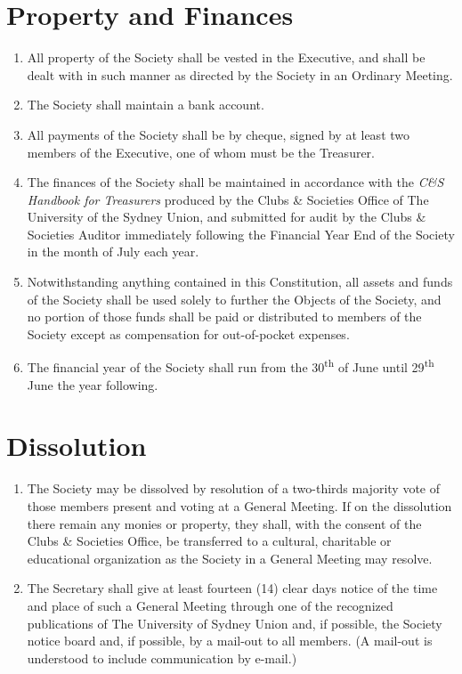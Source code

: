 \documentclass[11pt]{article}
\begin{document}
\section{Property and Finances}
\begin{enumerate}[\thesection .1]
    \item All property of the Society shall be vested in the Executive, and shall be dealt with in such manner as directed by the Society in an Ordinary Meeting.
    \item The Society shall maintain a bank account.
    \item All payments of the Society shall be by cheque, signed by at least two members of the Executive, one of whom must be the Treasurer.
    \item The finances of the Society shall be maintained in accordance with the \textit{C\&S Handbook for Treasurers} produced by the Clubs \& Societies Office of The University of the Sydney Union, and submitted for audit by the Clubs \& Societies Auditor immediately following the Financial Year End of the Society in the month of July each year.
    \item Notwithstanding anything contained in this Constitution, all assets and funds of the Society shall be used solely to further the Objects of the Society, and no portion of those funds shall be paid or distributed to members of the Society except as compensation for out-of-pocket expenses.
    \item The financial year of the Society shall run from the 30\textsuperscript{th} of June until 29\textsuperscript{th} June the year following.	
\end{enumerate}


\section{Dissolution}
\begin{enumerate}[\thesection .1]
    \item The Society may be dissolved by resolution of a two-thirds majority vote of those members present and voting at a General Meeting. If on the dissolution there remain any monies or property, they shall, with the consent of the Clubs \& Societies Office, be transferred to a cultural, charitable or educational organization as the Society in a General Meeting may resolve.
    \item The Secretary shall give at least fourteen (14) clear days notice of the time and place of such a General Meeting through one of the recognized publications of The University of Sydney Union and, if possible, the Society notice board and, if possible, by a mail-out to all members. (A mail-out is understood to include communication by e-mail.)
\end{enumerate}
\end{document}
